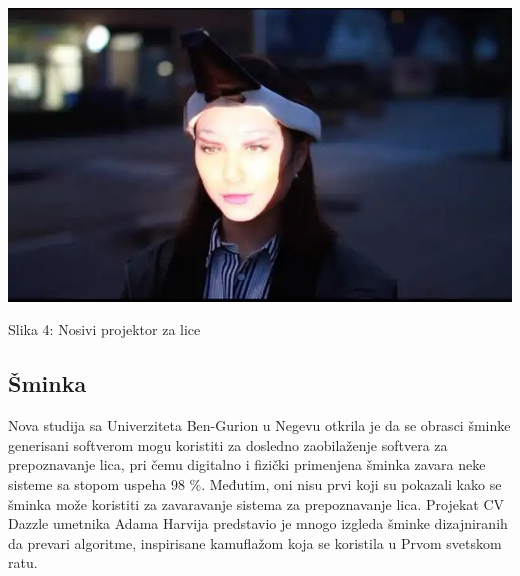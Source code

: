 \documentclass{article}
\begin{document}
\begin{center}
\begin{minipage}{0.5\textwidth}
\includegraphics[width=\textwidth]{projektor.jpg}
\end{minipage}

\vspace{0.5cm}

Slika 4: Nosivi projektor za lice
\end{center}

\subsection{Šminka}
Nova studija sa Univerziteta Ben-Gurion u Negevu otkrila je da se obrasci šminke generisani softverom mogu koristiti za dosledno zaobilaženje softvera za prepoznavanje lica, pri čemu digitalno i fizički primenjena šminka zavara neke sisteme sa stopom uspeha 98 \%.
\newline
\newline
Međutim, oni nisu prvi koji su pokazali kako se šminka može koristiti za zavaravanje sistema za prepoznavanje lica. Projekat CV Dazzle umetnika Adama Harvija predstavio je mnogo izgleda šminke dizajniranih da prevari algoritme, inspirisane kamuflažom koja se koristila u Prvom svetskom ratu. \cite{cetvrta}
\end{document}
